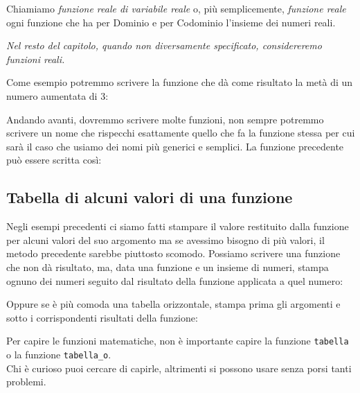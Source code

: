 \begin{definizione}
Chiamiamo \emph{funzione reale di variabile reale} o, più 
semplicemente, \emph{funzione reale} ogni funzione che ha per Dominio e 
per Codominio l'insieme dei numeri reali.
\end{definizione}

\emph{Nel resto del capitolo, quando non diversamente specificato, 
considereremo funzioni reali.}

\begin{esempio}
Come esempio potremmo scrivere la funzione che dà come risultato la metà di 
un numero aumentata di 3:


\end{esempio}

Andando avanti, dovremmo scrivere molte funzioni, non sempre potremmo 
scrivere un nome che rispecchi esattamente quello che fa la funzione stessa 
per cui sarà il caso che usiamo dei nomi più generici e semplici. 
La funzione precedente può essere scritta così:


\subsection{Tabella di alcuni valori di una funzione}

Negli esempi precedenti ci siamo fatti stampare il valore restituito dalla 
funzione per alcuni valori del suo argomento ma se avessimo bisogno di più 
valori, il metodo precedente sarebbe piuttosto scomodo. Possiamo scrivere 
una funzione che non dà risultato, ma, data una funzione e un insieme di 
numeri, stampa ognuno dei numeri seguito dal risultato della funzione 
applicata a quel numero:


Oppure se è più comoda una tabella orizzontale, stampa prima gli 
argomenti e sotto i corrispondenti risultati della funzione:


\begin{osservazione}
Per capire le funzioni matematiche, non è importante capire 
la funzione \quad \texttt{tabella} \quad o la funzione \quad 
\texttt{tabella\_o}.\\
Chi è curioso puoi cercare di capirle, altrimenti si possono usare senza 
porsi tanti problemi.
\end{osservazione}

